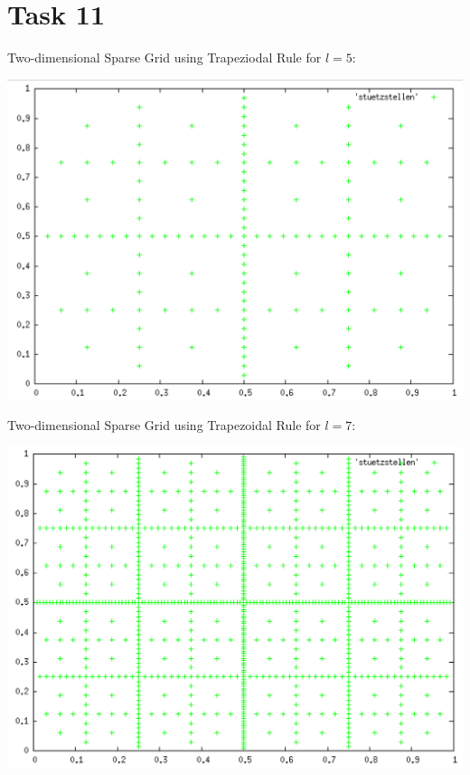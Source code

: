 \documentclass[10pt,a4paper]{article}
\begin{document}
\section*{Task 11}

Two-dimensional Sparse Grid using Trapeziodal Rule for $l=5$:
\begin{center}
\includegraphics[scale=0.5]{sparse_grid_l5.png}	
\end{center}

Two-dimensional Sparse Grid using Trapezoidal Rule for $l=7$:
\begin{center}
\includegraphics[scale=0.5]{sparse_grid_l7.png}	
\end{center}
\end{document}
